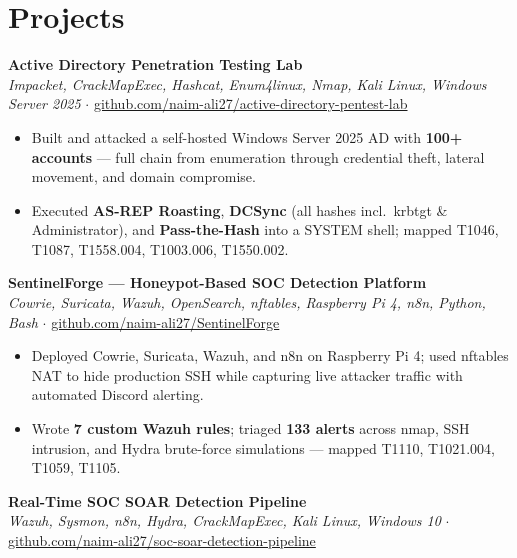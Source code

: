 \documentclass[10pt]{article}
\begin{document}
\section{Projects}

\textbf{Active Directory Penetration Testing Lab}\\
{\small\textit{Impacket, CrackMapExec, Hashcat, Enum4linux, Nmap, Kali Linux, Windows Server 2025} $\cdot$
\href{https://github.com/naim-ali27/active-directory-pentest-lab}{github.com/naim-ali27/active-directory-pentest-lab}}

\begin{itemize}
  \item Built and attacked a self-hosted Windows Server 2025 AD with \textbf{100+ accounts} --- full chain
    from enumeration through credential theft, lateral movement, and domain compromise.
  \item Executed \textbf{AS-REP Roasting}, \textbf{DCSync} (all hashes incl.\ krbtgt \& Administrator), and
    \textbf{Pass-the-Hash} into a SYSTEM shell; mapped T1046, T1087, T1558.004, T1003.006, T1550.002.
\end{itemize}

\vspace{3pt}
\textbf{SentinelForge --- Honeypot-Based SOC Detection Platform}\\
{\small\textit{Cowrie, Suricata, Wazuh, OpenSearch, nftables, Raspberry Pi 4, n8n, Python, Bash} $\cdot$
\href{https://github.com/naim-ali27/SentinelForge}{github.com/naim-ali27/SentinelForge}}

\begin{itemize}
  \item Deployed Cowrie, Suricata, Wazuh, and n8n on Raspberry Pi 4; used nftables NAT to hide
    production SSH while capturing live attacker traffic with automated Discord alerting.
  \item Wrote \textbf{7 custom Wazuh rules}; triaged \textbf{133 alerts} across nmap, SSH intrusion, and Hydra
    brute-force simulations --- mapped T1110, T1021.004, T1059, T1105.
\end{itemize}

\vspace{3pt}
\textbf{Real-Time SOC SOAR Detection Pipeline}\\
{\small\textit{Wazuh, Sysmon, n8n, Hydra, CrackMapExec, Kali Linux, Windows 10} $\cdot$
\href{https://github.com/naim-ali27/soc-soar-detection-pipeline}{github.com/naim-ali27/soc-soar-detection-pipeline}}
\end{document}

